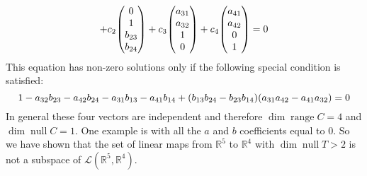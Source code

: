 \documentclass[11pt,a4paper]{scrartcl}
\DeclareMathOperator{\range}{range}
\DeclareMathOperator{\nspace}{null}
\newcommand{\lmap}[2]{\mathcal{L}(#1,#2)}
\newcommand{\RR}{\mathbb{R}}
\newcounter{problem}
\begin{document}
\begin{problem}[3.B.4]
{\[        +
        c_2 \mqty(0 \\ 1 \\ b_{23} \\ b_{24})    
        +
        c_3 \mqty(a_{31} \\ a_{32} \\ 1 \\ 0)
        +
        c_4 \mqty(a_{41} \\ a_{42} \\ 0 \\ 1)
        =
        0
        \]
        This equation has non-zero solutions only if the following special condition is satisfied:
        \[
          1 - a_{32}b_{23} - a_{42}b_{24}-a_{31}b_{13}-a_{41}b_{14} 
          + \qty(b_{13}b_{24}-b_{23}b_{14})\qty(a_{31}a_{42}-a_{41}a_{32})=0  
        \]
        In general these four vectors are independent and therefore $\dim \range C =4$
        and $\dim \nspace C=1$. One example is with all the $a$ and $b$ coefficients equal to 0.
        So we have shown that the set of linear maps from
        $\RR^5$ to $\RR^4$ with $\dim \nspace T>2$ is not a subspace of $\lmap{\RR^5}{\RR^4}$.
    }
\end{problem}
\end{document}
